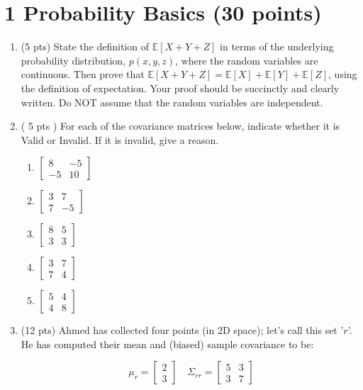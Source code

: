 \documentclass{article}
\theoremstyle{definition}
\begin{document}
\section*{1 Probability Basics (30 points)}
\begin{enumerate}[label=\Alph*.]
\item (5 pts) State the definition of $\mathbb{E}[X+Y+Z]$ in terms of the underlying probability distribution, $p(x, y, z)$, where the random variables are continuous. Then prove that $\mathbb{E}[X+Y+Z]=\mathbb{E}[X]+\mathbb{E}[Y]+\mathbb{E}[Z]$, using the definition of expectation. Your proof should be succinctly and clearly written. Do NOT assume that the random variables are independent.\\
\item ( 5 pts ) For each of the covariance matrices below, indicate whether it is Valid or Invalid. If it is invalid, give a reason.\\
\begin{enumerate}[label=(\alph*)]
    \item $\left[\begin{array}{cc}8 & -5 \\ -5 & 10\end{array}\right]$
    \item $\left[\begin{array}{cc}3 & 7 \\ 7 & -5\end{array}\right]$
    \item $\left[\begin{array}{ll}8 & 5 \\ 3 & 3\end{array}\right]$
    \item $\left[\begin{array}{ll}3 & 7 \\ 7 & 4\end{array}\right]$
    \item $\left[\begin{array}{ll}5 & 4 \\ 4 & 8\end{array}\right]$
\end{enumerate}
\item (12 pts) Ahmed has collected four points (in 2D space); let's call this set '$r$'. He has computed their mean and (biased) sample covariance to be:

$$
\mu_{r}=\left[\begin{array}{l}
2 \\
3
\end{array}\right] \quad \Sigma_{r r}=\left[\begin{array}{ll}
5 & 3 \\
3 & 7
\end{array}\right]
$$


\end{enumerate}
\end{document}

